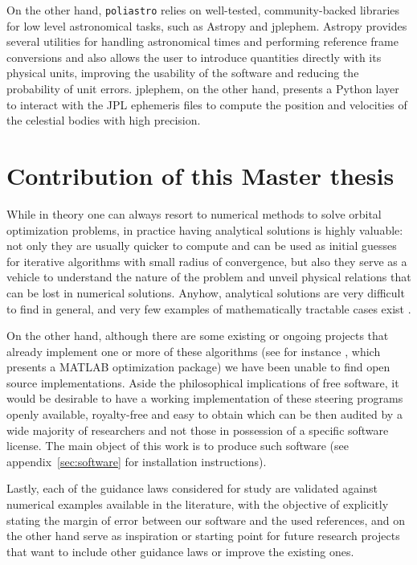 On the other hand, \verb|poliastro| relies on well-tested, community-backed libraries for low level astronomical tasks, such as Astropy\cite{robitaille2013astropy} and jplephem. Astropy provides several utilities for handling astronomical times and performing reference frame conversions and also allows the user to introduce quantities directly with its physical units, improving the usability of the software and reducing the probability of unit errors. jplephem, on the other hand, presents a Python layer to interact with the JPL ephemeris files to compute the position and velocities of the celestial bodies with high precision.

\section{Contribution of this Master thesis} \label{sec:contribution}

While in theory one can always resort to numerical methods to solve orbital optimization problems, in practice having analytical solutions is highly valuable: not only they are usually quicker to compute and can be used as initial guesses for iterative algorithms with small radius of convergence, but also they serve as a vehicle to understand the nature of the problem and unveil physical relations that can be lost in numerical solutions. Anyhow, analytical solutions are very difficult to find in general, and very few examples of mathematically tractable cases exist \cite{battin1999introduction}.

On the other hand, although there are some existing or ongoing projects that already implement one or more of these algorithms (see for instance \cite{dicarlo2016camelot}, which presents a MATLAB optimization package)  we have been unable to find open source implementations. Aside the philosophical implications of free software, it would be desirable to have a working implementation of these steering programs openly available, royalty-free and easy to obtain which can be then audited by a wide majority of researchers and not those in possession of a specific software license. The main object of this work is to produce such software (see appendix~\ref{sec:software} for installation instructions).

Lastly, each of the guidance laws considered for study are validated against numerical examples available in the literature, with the objective of explicitly stating the margin of error between our software and the used references, and on the other hand serve as inspiration or starting point for future research projects that want to include other guidance laws or improve the existing ones.